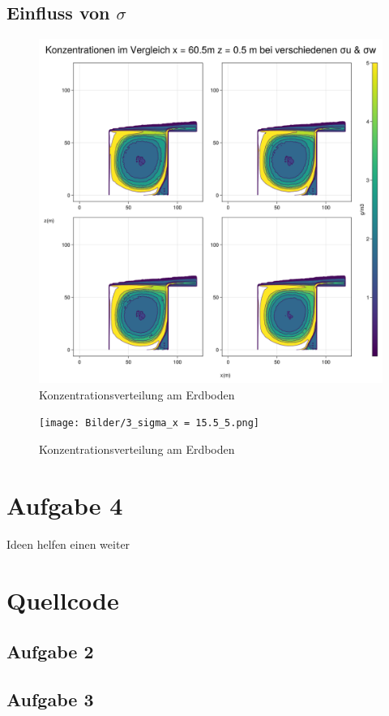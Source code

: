 \documentclass[ngerman]{scrartcl}
\begin{document}
\subsection{Einfluss von $\sigma$ }
\begin{figure}[H]
	\centering
	\includegraphics[scale=0.3]{Bilder/3_sigma_x = 60.5.png}
	\caption{Konzentrationsverteilung am Erdboden}
	\label{fig:my_label}
\end{figure}
\begin{figure}[H]
	\centering
	\texttt{[image: Bilder/3\_sigma\_x = 15.5\_5.png]}
	\caption{Konzentrationsverteilung am Erdboden}
	\label{fig:my_label}
\end{figure}
\section{Aufgabe  4}
Ideen helfen einen weiter
\section{Quellcode}
\subsection{Aufgabe 2}

\subsection{Aufgabe 3}

\end{document}
